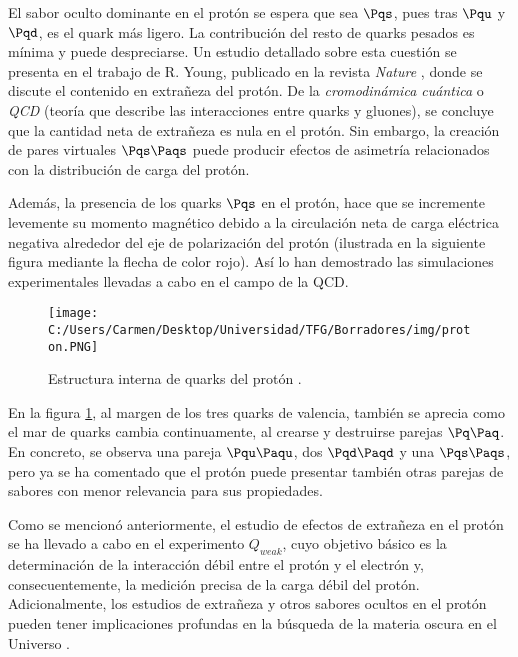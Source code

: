 El sabor oculto dominante en el protón se espera que sea $\Pqs$, pues tras $\Pqu$ y $\Pqd$, es el quark más ligero. La contribución del resto de quarks pesados es mínima y puede despreciarse. Un estudio detallado sobre esta cuestión se presenta en el trabajo de R. Young, publicado en la revista \textit{Nature} \cite{protonYoung}, donde se discute el contenido en extrañeza del protón. De la \textit{cromodinámica cuántica} o \textit{QCD} (teoría que describe las interacciones entre quarks y gluones), se concluye que la cantidad neta de extrañeza es nula en el protón. Sin embargo, la creación de pares virtuales $\Pqs\Paqs$ puede producir efectos de asimetría relacionados con la distribución de carga del protón.

Además, la presencia de los quarks $\Pqs$ en el protón, hace que se incremente levemente su momento magnético debido a la circulación neta de carga eléctrica negativa alrededor del eje de polarización del protón (ilustrada en la siguiente figura mediante la flecha de color rojo). Así lo han demostrado las simulaciones experimentales llevadas a cabo en el campo de la QCD.

\begin{figure}[h!]
	\centering
	\texttt{[image: C:/Users/Carmen/Desktop/Universidad/TFG/Borradores/img/proton.PNG]}
	\caption[Estructura interna del protón]
	{Estructura interna de quarks del protón \cite{protonYoung}.}
	\label{fig:proton}
\end{figure}

En la figura \ref{fig:proton}, al margen de los tres quarks de valencia, también se aprecia como el mar de quarks cambia continuamente, al crearse y destruirse parejas $\Pq\Paq$. En concreto, se observa una pareja $\Pqu\Paqu$, dos $\Pqd\Paqd$ y una $\Pqs\Paqs$, pero ya se ha comentado que el protón puede presentar también otras parejas de sabores con menor relevancia para sus propiedades. 

Como se mencionó anteriormente, el estudio de efectos de extrañeza en el protón se ha llevado a cabo en el experimento $Q_{weak}$, cuyo objetivo básico es la determinación de la interacción débil entre el protón y el electrón y, consecuentemente, la medición precisa de la carga débil del protón. Adicionalmente, los estudios de extrañeza y otros sabores ocultos en el protón pueden tener implicaciones profundas en la búsqueda de la materia oscura en el Universo \cite{protonYoung}. 
